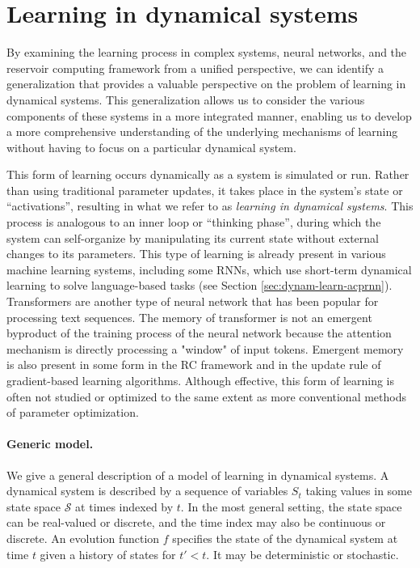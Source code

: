 \section{Learning in dynamical systems}

By examining the learning process in complex systems, neural networks, and
the reservoir computing framework from a unified perspective, we can
identify a generalization that provides a valuable perspective on the problem of
learning in dynamical systems. This generalization allows us to consider the
various components of these systems in a more integrated manner, enabling us to
develop a more comprehensive understanding of the underlying mechanisms of
learning without having to focus on a particular dynamical system.

This form of learning occurs dynamically as a system is simulated or run. Rather
than using traditional parameter updates, it takes place in the system's state
or ``activations'', resulting in what we refer to as \emph{learning in dynamical
  systems}. This process is analogous to an inner loop or ``thinking phase'',
during which the system can self-organize by manipulating its current state
without external changes to its parameters. This type of learning is already
present in various machine learning systems, including some \acfp{RNN}, which
use short-term dynamical learning to solve language-based tasks (see Section
\ref{sec:dynam-learn-acprnn}). Transformers are another type of neural network 
that has been popular for processing text sequences. The memory of transformer 
is not an emergent byproduct of the training process of the neural network because 
the attention mechanism is directly processing a "window" of input tokens. Emergent 
memory is also present in some form in the \ac{RC}
framework and in the update rule of gradient-based learning algorithms. Although
effective, this form of learning is often not studied or optimized to the same
extent as more conventional methods of parameter optimization.

\paragraph{Generic model.}\label{sec:generic-model}
We give a general description of a model of learning in dynamical systems. A
dynamical system is described by a sequence of variables $S_{t}$ taking values
in some state space $\mathcal{S}$ at times indexed by $t$. In the most general setting, the
state space can be real-valued or discrete, and the time index may also be
continuous or discrete. An evolution function $f$ specifies the state of the
dynamical system at time $t$ given a history of states for $t' < t$. It may be
deterministic or stochastic.

